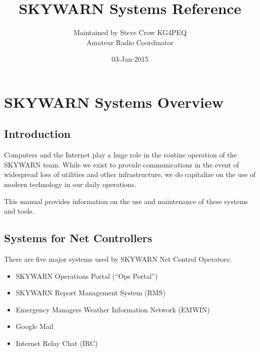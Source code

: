 \documentclass[pdflatex,letterpaper,twoside,12pt]{book}
\title             {SKYWARN Systems Reference}
\author            {Maintained by Steve Crow KG4PEQ\\Amateur Radio Coordinator}
\date              {03-Jan-2015}
\begin{document}
\skywarnTitlePage
\skipToTOC
\skywarnTOC


\chapter{SKYWARN Systems Overview}


\section{Introduction}

Computers and the Internet play a huge role in the routine operation of the SKYWARN team.  While we exist to provide communications in the event of widespread loss of utilities and other infrastructure, we do capitalize on the use of modern technology in our daily operations.

This manual provides information on the use and maintenance of these systems 
and tools.


\section{Systems for Net Controllers}\label{nco-systems}

There are five major systems used by SKYWARN Net Control Operators:

\begin{itemize}
\item SKYWARN Operations Portal (``Ops Portal'')
\item SKYWARN Report Management System (RMS)
\item Emergency Managers Weather Information Network (EMWIN)
\item Google Mail
\item Internet Relay Chat (IRC)
\end{itemize}
\end{document}

